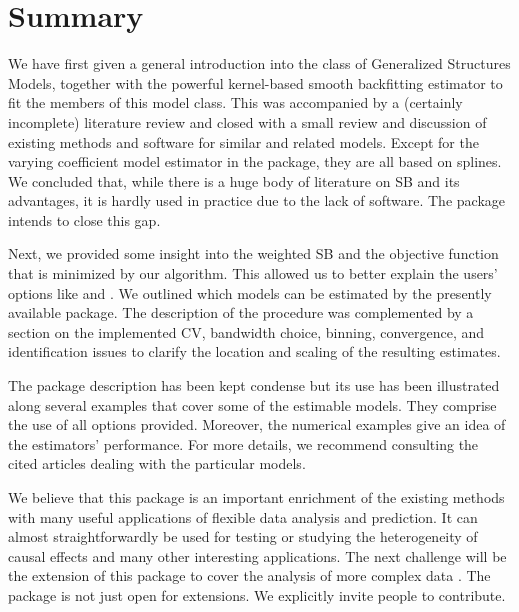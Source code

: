 \section{Summary}\label{sec-conclusions}

We have first given a general introduction into the class of Generalized Structures Models, together with the powerful kernel-based smooth backfitting estimator to fit the members of this model class. This was accompanied by a (certainly incomplete) literature review and closed
with a small review and discussion of existing methods and software for similar and related models.
Except for the varying coefficient model estimator in the  package, they are all based on splines. We concluded that, while there is a huge body of literature on SB and its advantages, it is hardly used in practice due to the lack of software. The  package intends to close this gap.

Next, we provided some insight into the weighted SB and the objective function that is minimized by our algorithm. This allowed us to better explain the users' options like   and  . We outlined which models can be estimated by the presently available package. The description of the procedure was complemented by a section on the implemented CV, bandwidth choice, binning, convergence, and identification issues to clarify the location and scaling of the resulting estimates. 

The package description has been kept condense but its use has been illustrated along several examples that cover some of the estimable models. They comprise the use of all options provided. Moreover, the numerical examples give an idea of the estimators' performance. For more details, we recommend consulting the cited articles dealing with the particular models.

We believe that this package is an important enrichment of the existing methods with many useful applications of flexible data analysis and prediction.   
It can almost straightforwardly be used for testing 
\citep{CadarsoEtal2006,MammenSperlich2021} or
studying  the heterogeneity of causal effects
\citep{BeniniSperlich2021}
and many other interesting applications.
The next challenge will be the extension of this package to cover the analysis of more complex data \citep{JeonPark2020}.
The package is not just open for extensions. We explicitly invite people to contribute.



